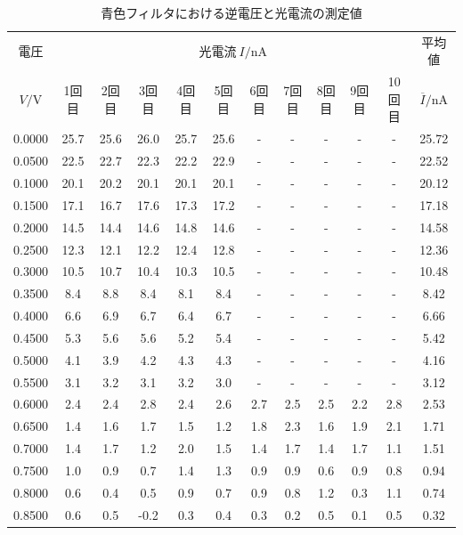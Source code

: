 \documentclass{jarticle}
\begin{document}
\begin{table}[H]
  \caption{青色フィルタにおける逆電圧と光電流の測定値}
  \label{tb:blue-filter}
  \hspace{-2.5cm}
  \begin{tabular}{cccccccccccc}
    \hline
    電圧 & \multicolumn{10}{c}{光電流$\ I/\mathrm{nA}$} & 平均値 \\
    $V/\mathrm{V}$ & 1回目 & 2回目 & 3回目 & 4回目 & 5回目 & 6回目 & 7回目 & 8回目 & 9回目 & 10回目 & $\overline{I}/\mathrm{nA}$ \\
    \hline
    0.0000 & 25.7 & 25.6 & 26.0 & 25.7 & 25.6 & - & - & - & - & - & 25.72 \\
    0.0500 & 22.5 & 22.7 & 22.3 & 22.2 & 22.9 & - & - & - & - & - & 22.52 \\
    0.1000 & 20.1 & 20.2 & 20.1 & 20.1 & 20.1 & - & - & - & - & - & 20.12 \\
    0.1500 & 17.1 & 16.7 & 17.6 & 17.3 & 17.2 & - & - & - & - & - & 17.18 \\
    0.2000 & 14.5 & 14.4 & 14.6 & 14.8 & 14.6 & - & - & - & - & - & 14.58 \\
    0.2500 & 12.3 & 12.1 & 12.2 & 12.4 & 12.8 & - & - & - & - & - & 12.36 \\
    0.3000 & 10.5 & 10.7 & 10.4 & 10.3 & 10.5 & - & - & - & - & - & 10.48 \\
    0.3500 & 8.4 & 8.8 & 8.4 & 8.1 & 8.4 & - & - & - & - & - & 8.42 \\
    0.4000 & 6.6 & 6.9 & 6.7 & 6.4 & 6.7 & - & - & - & - & - & 6.66 \\
    0.4500 & 5.3 & 5.6 & 5.6 & 5.2 & 5.4 & - & - & - & - & - & 5.42 \\
    0.5000 & 4.1 & 3.9 & 4.2 & 4.3 & 4.3 & - & - & - & - & - & 4.16 \\
    0.5500 & 3.1 & 3.2 & 3.1 & 3.2 & 3.0 & - & - & - & - & - & 3.12 \\
    0.6000 & 2.4 & 2.4 & 2.8 & 2.4 & 2.6 & 2.7 & 2.5 & 2.5 & 2.2 & 2.8 & 2.53 \\
    0.6500 & 1.4 & 1.6 & 1.7 & 1.5 & 1.2 & 1.8 & 2.3 & 1.6 & 1.9 & 2.1 & 1.71 \\
    0.7000 & 1.4 & 1.7 & 1.2 & 2.0 & 1.5 & 1.4 & 1.7 & 1.4 & 1.7 & 1.1 & 1.51 \\
    0.7500 & 1.0 & 0.9 & 0.7 & 1.4 & 1.3 & 0.9 & 0.9 & 0.6 & 0.9 & 0.8 & 0.94 \\
    0.8000 & 0.6 & 0.4 & 0.5 & 0.9 & 0.7 & 0.9 & 0.8 & 1.2 & 0.3 & 1.1 & 0.74 \\
    0.8500 & 0.6 & 0.5 & -0.2 & 0.3 & 0.4 & 0.3 & 0.2 & 0.5 & 0.1 & 0.5 & 0.32 \\
    \hline
  \end{tabular}
\end{table}
\end{document}
